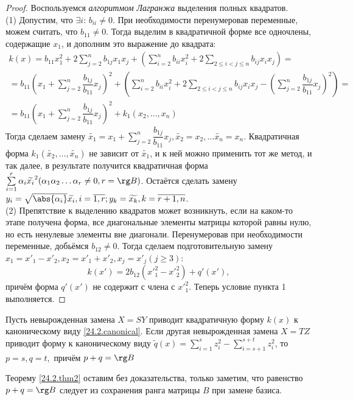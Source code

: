 \begin{proof} Воспользуемся \textit{алгоритмом Лагранжа} выделения полных квадратов.\\
(1) Допустим,	что $\exists i$: $b_{ii} \neq 0$. При 	необходимости перенумеровав переменные, можем считать, что $b_{11} \neq 0$. Тогда выделим в квадратичной форме все одночлены, содержащие $x_1$, и дополним это выражение до квадрата:
\begin{equation*}\begin{array}{crl}
k(x)=b_{11}x_1^2+2\sum\limits_{j=2}^nb_{1j}x_1x_j+(\sum\limits_{i=2}^nb_{ii}x_i^2+2\sum\limits_{2\le i<j\le n} b_{ij}x_ix_j)=\\
=b_{11}(x_1+\sum\limits_{j=2}^n\dfrac{b_{1j}}{b_{11}}x_j)^2+(\sum\limits_{i=2}^nb_{ii}x_i^2+2\sum\limits_{2\le i<j\le n} b_{ij}x_ix_j-(\sum\limits_{j=2}^n\dfrac{b_{1j}}{b_{11}}x_j)^2)=\\
=b_{11}(x_1+\sum\limits_{j=2}^n\dfrac{b_{1j}}{b_{11}}x_j)^2+k_1(x_2,\ldots, x_n)
\end{array}\end{equation*}
Тогда сделаем замену $\widetilde{x_1}=x_1+\sum\limits_{j=2}^n\dfrac{b_{1j}}{b_{11}}x_j, \widetilde{x_2}=x_2,\ldots \widetilde{x_n}=x_n$. Квадратичная форма $k_1(\widetilde{x_2},\ldots, \widetilde{x_n})$ не зависит от $\widetilde{x_1}$, и к ней можно применить тот же метод, и так далее, в результате получится квадратичная форма $\sum\limits_{i=1}^r\alpha_i\widetilde{x_i}^2 (\alpha_1\alpha_2\ldots\alpha_r \neq 0, r=\rg B)$. Остаётся сделать замену $y_i=\sqrt{\abs{\alpha_i}}\widetilde{x_i}, i=\overline{1,r}; y_k=\widetilde{x_k}, k=\overline{r+1,n}$.\\
(2) Препятствие к выделению квадратов может возникнуть, если на каком-то этапе получена форма, все диагональные элементы матрицы которой равны нулю, но есть ненулевые элементы вне диагонали. Перенумеровав при необходимости переменные, добьёмся $b_{12} \neq 0$. Тогда сделаем подготовительную замену $x_1=x'_1-x'_2,x_2=x'_1+x'_2,x_j=x'_j (j \ge 3)$:
\begin{equation*}
k(x')=2b_{12}({x'}_1^2-{x'}_2^2)+q'(x'),
\end{equation*}
причём форма $q'(x')$ не содержит с члена с ${x'}_1^2$. Теперь условие пункта 1 выполняется.
\end{proof}

\begin{thm}\label{24.2.thm2}
Пусть невырожденная замена $X=SY$ приводит квадратичную форму $k(x)$ к каноническому виду \eqref{24.2.canonical}. Если другая невырожденная замена $X=TZ$ приводит форму к каноническому виду $\widetilde q(x)=\sum\limits_{i=1}^sz_i^2-\sum\limits_{i=s+1}^{s+t}z_i^2$, то $p=s,q=t,$ причём $p+q=\rg B$
\end{thm} 
Теорему \ref{24.2.thm2} оставим без доказательства, только заметим, что равенство $p+q=\rg B$ следует из сохранения ранга матрицы $B$ при замене базиса.